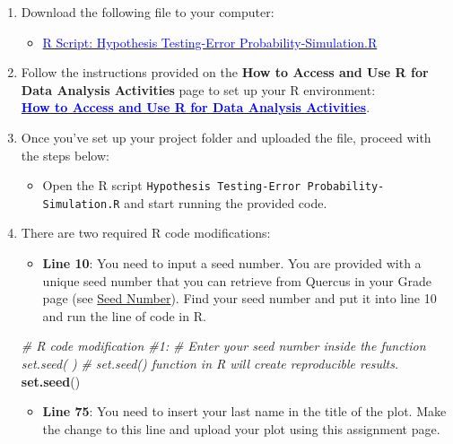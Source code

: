 \documentclass[oneside,openany]{book}
\newenvironment{Shaded}{\begin{snugshade}}{\end{snugshade}}
\newcommand{\CommentTok}[1]{\textcolor[rgb]{0.56,0.35,0.01}{\textit{#1}}}
\newcommand{\FunctionTok}[1]{\textcolor[rgb]{0.13,0.29,0.53}{\textbf{#1}}}
\newcommand{\NormalTok}[1]{#1}
\providecommand{\tightlist}{%
  \setlength{\itemsep}{0pt}\setlength{\parskip}{0pt}}
\begin{document}
\begin{enumerate}
\def\labelenumi{\arabic{enumi}.}
\item
  Download the following file to your computer:

  \begin{itemize}
  \tightlist
  \item
    \href{https://raw.githubusercontent.com/aslemand/Data-Analysis-Activities/main/data/Activity_6/Hypothesis-Testing-Error-Probability-Simulation.R}{\textcolor{blue}{R Script: Hypothesis Testing-Error Probability-Simulation.R}}
  \end{itemize}
\item
  Follow the instructions provided on the \textbf{How to Access and Use R for Data Analysis Activities} page to set up your R environment:\\
  \hyperref[how-to-set-up-r-for-data-analysis-activities]{\textcolor{blue}{\textbf{How to Access and Use R for Data Analysis Activities}}}.
\item
  Once you've set up your project folder and uploaded the file, proceed with the steps below:

  \begin{itemize}
  \tightlist
  \item
    Open the R script \texttt{Hypothesis\ Testing-Error\ Probability-Simulation.R} and start running the provided code.
  \end{itemize}
\item
  There are two required R code modifications:

  \begin{itemize}
  \tightlist
  \item
    \textbf{Line 10}: You need to input a seed number. You are provided with a unique seed number that you can retrieve from Quercus in your Grade page (see \hyperref[]{Seed Number}). Find your seed number and put it into line 10 and run the line of code in R.
  \end{itemize}

\begin{Shaded}
\begin{Highlighting}[]
\CommentTok{\# R code modification \#1: }
\CommentTok{\# Enter your seed number inside the function set.seed( ) }
\CommentTok{\# set.seed() function in R will create reproducible results.}
\FunctionTok{set.seed}\NormalTok{()}
\end{Highlighting}
\end{Shaded}

  \begin{itemize}
  \tightlist
  \item
    \textbf{Line 75}: You need to insert your last name in the title of the plot. Make the change to this line and upload your plot using this assignment page.
  \end{itemize}


\end{enumerate}
\end{document}
